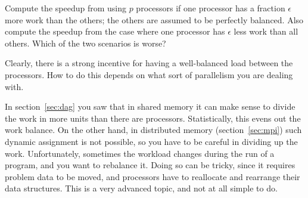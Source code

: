 \begin{exercise}
  Compute the speedup from using $p$ processors if one processor has a
  fraction $\epsilon$ more work than the others; the others are
  assumed to be perfectly balanced. Also compute the speedup from the
  case where one processor has $\epsilon$ less work than all
  others. Which of the two scenarios is worse?
\end{exercise}

Clearly, there is a strong incentive for having a well-balanced
load between the processors. How to do this depends on what sort
of parallelism you are dealing with.

In section~\ref{sec:dag} you saw that in shared memory it can make
sense to divide the work in more units than there are processors.
Statistically, this evens out the work balance.
On the other hand, in distributed memory (section~\ref{sec:mpi})
such dynamic assignment is not possible, so you have to be careful
in dividing up the work.
Unfortunately, sometimes the workload
changes during the run of a program, and you want to rebalance it.
Doing so can be tricky, since it requires problem data to be moved,
and processors have to reallocate and rearrange their data structures.
This is a very advanced topic, and not at all simple to do.

\endinput
\begin{review}
  \Level 1 {Review questions}
  
\end{review}
